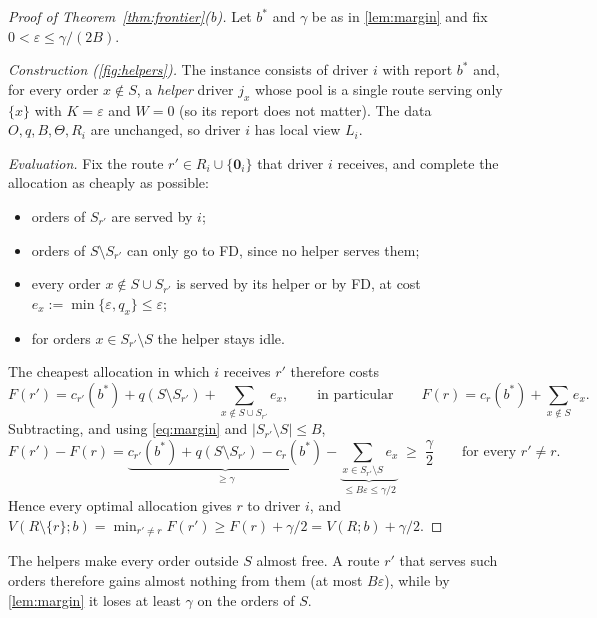 \documentclass[11pt]{article}
\theoremstyle{definition}
\theoremstyle{remark}
\newcommand{\idle}{\mathbf{0}}
\begin{document}
\begin{proof}[Proof of Theorem~\ref{thm:frontier}(b)]
Let $b^*$ and $\gamma$ be as in \cref{lem:margin} and fix
$0<\varepsilon\le\gamma/(2B)$.

\emph{Construction (\cref{fig:helpers}).} The instance consists of driver $i$
with report $b^*$ and, for every order $x\notin S$, a \emph{helper} driver $j_x$
whose pool is a single route serving only $\{x\}$ with $K=\varepsilon$ and
$W=0$ (so its report does not matter). The data $O,q,B,\Theta,R_i$ are
unchanged, so driver $i$ has local view $L_i$.

\emph{Evaluation.} Fix the route $r'\in R_i\cup\{\idle_i\}$ that driver $i$
receives, and complete the allocation as cheaply as possible:
\begin{itemize}[leftmargin=1.4em, itemsep=1pt]
\item orders of $S_{r'}$ are served by $i$;
\item orders of $S\setminus S_{r'}$ can only go to FD, since no helper serves
them;
\item every order $x\notin S\cup S_{r'}$ is served by its helper or by FD, at
cost $e_x:=\min\{\varepsilon,q_x\}\le\varepsilon$;
\item for orders $x\in S_{r'}\setminus S$ the helper stays idle.
\end{itemize}
The cheapest allocation in which $i$ receives $r'$ therefore costs
\[
F(r')=c_{r'}(b^*)+q(S\setminus S_{r'})+\sum_{x\notin S\cup S_{r'}}e_x,
\qquad\text{in particular}\qquad
F(r)=c_r(b^*)+\sum_{x\notin S}e_x .
\]
Subtracting, and using \eqref{eq:margin} and $|S_{r'}\setminus S|\le B$,
\[
F(r')-F(r)=\underbrace{c_{r'}(b^*)+q(S\setminus S_{r'})-c_r(b^*)}_{\ge\gamma}
-\underbrace{\sum_{x\in S_{r'}\setminus S}e_x}_{\le B\varepsilon\le\gamma/2}
\;\ge\;\frac{\gamma}{2}\qquad\text{for every }r'\ne r.
\]
Hence every optimal allocation gives $r$ to driver $i$, and
$V(R\setminus\{r\};b)=\min_{r'\ne r}F(r')\ge F(r)+\gamma/2=V(R;b)+\gamma/2$.
\end{proof}

The helpers make every order outside $S$ almost free. A route $r'$ that serves
such orders therefore gains almost nothing from them (at most $B\varepsilon$),
while by \cref{lem:margin} it loses at least $\gamma$ on the orders of $S$.
\end{document}
